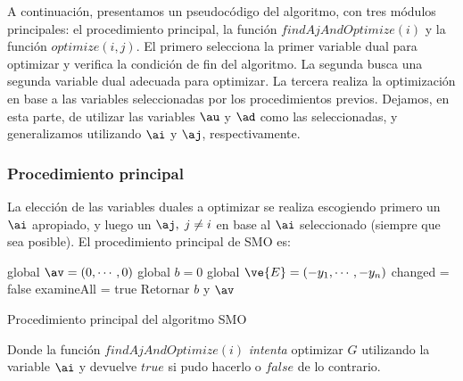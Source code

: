 A continuación, presentamos un pseudocódigo del algoritmo, con tres módulos principales: el procedimiento principal, la función $findAjAndOptimize(i)$ y la función $optimize(i,j)$. El primero selecciona la primer variable dual para optimizar y verifica la condición de fin del algoritmo. La segunda busca una segunda variable dual adecuada para optimizar. La tercera realiza la optimización en base a las variables seleccionadas por los procedimientos previos. Dejamos, en esta parte, de utilizar las variables $\au$ y $\ad$ como las seleccionadas, y generalizamos utilizando $\ai$ y $\aj$, respectivamente.

\subsubsection{Procedimiento principal}

La elección de las variables duales a optimizar se realiza escogiendo primero un $\ai$ apropiado, y luego un $\aj, \; j \neq i$ en base al $\ai$ seleccionado (siempre que sea posible). El procedimiento principal de SMO es:

\begin{algorithm}[H]
global $\av=(0,\cdots,0)$ \;
global $b=0$ \;
global $\ve{E}=(-y_1,\cdots,-y_n)$ \;
changed = false \;
examineAll = true \;
Retornar  $b$ y $\av$ \;
\caption{Procedimiento principal del algoritmo SMO} 
\end{algorithm}

Donde la función $findAjAndOptimize(i)$ \textit{intenta} optimizar $G$ utilizando la variable $\ai$ y devuelve $true$ si pudo hacerlo o $false$ de lo contrario. 

